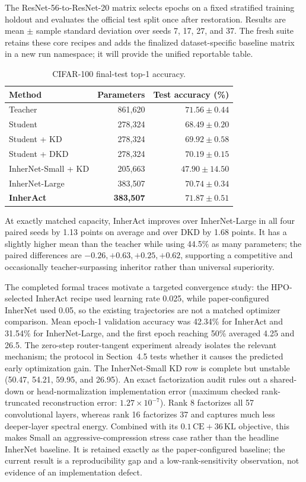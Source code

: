 \documentclass{article}
\begin{document}
The ResNet-56-to-ResNet-20 matrix selects epochs on a fixed stratified training
holdout and evaluates the official test split once after restoration.  Results
are mean $\pm$ sample standard deviation over seeds 7, 17, 27, and 37. The
fresh suite retains these core recipes and adds the finalized dataset-specific
baseline matrix in a new run namespace; it will provide the unified reportable
table.

\begin{table}[t]
\centering
\small
\begin{tabular}{@{}lrr@{}}
\toprule
Method & Parameters & Test accuracy (\%) \\
\midrule
Teacher & 861,620 & $71.56\pm0.44$ \\
Student & 278,324 & $68.49\pm0.20$ \\
Student + KD & 278,324 & $69.92\pm0.58$ \\
Student + DKD & 278,324 & $70.19\pm0.15$ \\
InherNet-Small + KD & 205,663 & $47.90\pm14.50$ \\
InherNet-Large & 383,507 & $70.74\pm0.34$ \\
\textbf{InherAct} & \textbf{383,507} & $\mathbf{71.87\pm0.51}$ \\
\bottomrule
\end{tabular}
\caption{CIFAR-100 final-test top-1 accuracy.}
\label{tab:formal-cifar100}
\end{table}

At exactly matched capacity, InherAct improves over InherNet-Large in all four
paired seeds by 1.13 points on average and over DKD by 1.68 points.  It has a
slightly higher mean than the teacher while using 44.5\% as many parameters;
the paired differences are $-0.26,+0.63,+0.25,+0.62$, supporting a competitive
and occasionally teacher-surpassing inheritor rather than universal
superiority.

The completed formal traces motivate a targeted convergence study: the
HPO-selected InherAct recipe used learning rate 0.025, while paper-configured
InherNet used 0.05, so the existing trajectories are not a matched optimizer
comparison. Mean epoch-1 validation accuracy was 42.34\% for InherAct and
31.54\% for InherNet-Large, and the first epoch reaching 50\% averaged 4.25
and 26.5. The zero-step router-tangent experiment already isolates the
relevant mechanism; the protocol in Section~4.5 tests whether it causes the
predicted early optimization gain. The
InherNet-Small KD row is complete but unstable (50.47, 54.21, 59.95, and
26.95).  An exact factorization audit rules out a shared-down or
head-normalization implementation error (maximum checked rank-truncated
reconstruction error: $1.27\times10^{-7}$).  Rank 8 factorizes all 57
convolutional layers, whereas rank 16 factorizes 37 and captures much less
deeper-layer spectral energy.  Combined with its $0.1\,\mathrm{CE}+36\,\mathrm{KL}$
objective, this makes Small an aggressive-compression stress case rather than
the headline InherNet baseline. It is retained exactly as the paper-configured
baseline; the current result is a reproducibility gap and a low-rank-sensitivity
observation, not evidence of an implementation defect.
\end{document}
